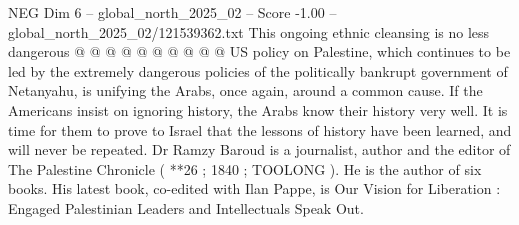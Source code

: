 \begin{textsample}{NEG Dim 6 – global\_north\_2025\_02 – Score -1.00 – global\_north\_2025\_02/121539362.txt}
This ongoing ethnic cleansing is no less dangerous @ @ @ @ @ @ @ @ @ @ US policy on Palestine, which continues to be led by the extremely dangerous policies of the politically bankrupt government of Netanyahu, is unifying the Arabs, once again, around a common cause.
If the Americans insist on ignoring history, the Arabs know their history very well.
It is time for them to prove to Israel that the lessons of history have been learned, and will never be repeated.
Dr Ramzy Baroud is a journalist, author and the editor of The Palestine Chronicle ( **26 ; 1840 ; TOOLONG ).
He is the author of six books.
His latest book, co-edited with Ilan Pappe, is Our Vision for Liberation : Engaged Palestinian Leaders and Intellectuals Speak Out.

\end{textsample}
